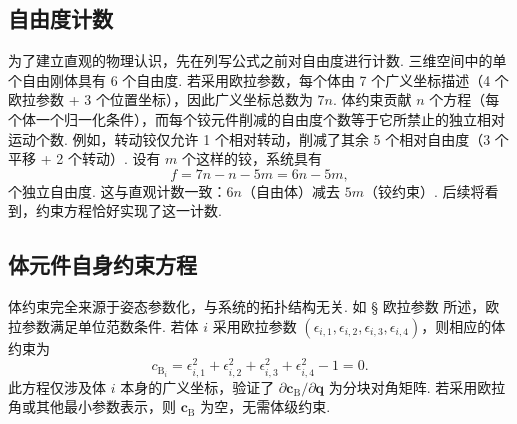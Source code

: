 \subsection{自由度计数}
为了建立直观的物理认识，先在列写公式之前对自由度进行计数. 三维空间中的单个自由刚体具有 6 个自由度. 若采用欧拉参数，每个体由 7 个广义坐标描述（4 个欧拉参数 + 3 个位置坐标），因此广义坐标总数为 $7n$. 体约束贡献 $n$ 个方程（每个体一个归一化条件），而每个铰元件削减的自由度个数等于它所禁止的独立相对运动个数.
例如，转动铰仅允许 1 个相对转动，削减了其余 5 个相对自由度（3 个平移 + 2 个转动）. 设有 $m$ 个这样的铰，系统具有
\[
f = 7n - n - 5m = 6n - 5m,
\]
个独立自由度. 这与直观计数一致：$6n$（自由体）减去 $5m$（铰约束）. 后续将看到，约束方程恰好实现了这一计数.
\subsection{体元件自身约束方程}
体约束完全来源于姿态参数化，与系统的拓扑结构无关. 如 § 欧拉参数 所述，欧拉参数满足单位范数条件. 若体 $i$ 采用欧拉参数 $(\epsilon_{i,1}, \epsilon_{i,2}, \epsilon_{i,3}, \epsilon_{i,4})$，则相应的体约束为
\[
c_{\text{B}_i} = \epsilon_{i,1}^2 + \epsilon_{i,2}^2 + \epsilon_{i,3}^2 + \epsilon_{i,4}^2 - 1 = 0.
\]
此方程仅涉及体 $i$ 本身的广义坐标，验证了 $\partial \boldsymbol{c}_{\text{B}} / \partial \boldsymbol{q}$ 为分块对角矩阵. 若采用欧拉角或其他最小参数表示，则 $\boldsymbol{c}_{\text{B}}$ 为空，无需体级约束.
